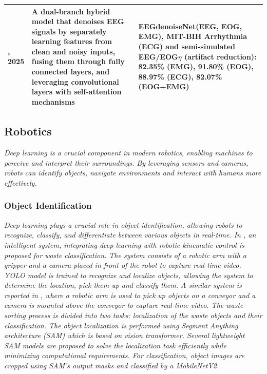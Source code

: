 \documentclass[preprint,12pt]{elsarticle}
\begin{document}
\begin{center}
\begin{table}
\begin{tabular}{|p{1cm} | p{6.5cm} | p{6.5cm}|}
 \hline
 \citep{cai_dhct-gan_2025}, 2025 & A dual-branch hybrid model that denoises EEG signals by separately learning features from clean and noisy inputs, fusing them through fully connected layers, and leveraging convolutional layers with self-attention mechanisms & EEGdenoiseNet(EEG, EOG, EMG), MIT-BIH Arrhythmia (ECG) and semi-simulated EEG/EOG\newline $\eta$ (artifact reduction): 82.35\% (EMG), 91.80\% (EOG), 88.97\% (ECG), 82.07\% (EOG+EMG)  \\ 
 \hline
\end{tabular}
\label{table_summary_eeg_studies}
\end{table}
\end{center}

\subsection{Robotics}
\emph{Deep learning is a crucial component in modern robotics, enabling machines to perceive and interpret their surroundings. By leveraging sensors and cameras, robots can identify objects, navigate environments and interact with humans more effectively.}

\subsubsection{Object Identification}
\emph{Deep learning plays a crucial role in object identification, allowing robots to recognize, classify, and differentiate between various objects in real-time. In \citep{le_application_2025}, an intelligent system, integrating deep learning with robotic kinematic control is proposed for waste classification. The system consists of a robotic arm with a gripper and a camera placed in front of the robot to capture real-time video. YOLO model is trained to recognize and localize objects, allowing the system to determine the location, pick them up and classify them. A similar system is reported in \citep{vukicevic_versatile_2025}, where a robotic arm is used to pick up objects on a conveyor and a camera is mounted above the conveyor to capture real-time video. The waste sorting process is divided into two tasks: localization of the waste objects and their classification. The object localization is performed using Segment Anything architecture (SAM) \citep{kirillov_segment_2023} which is based on vision transformer. Several lightweight SAM models are proposed to solve the localization task efficiently while minimizing computational requirements. For classification, object images are cropped using SAM's output masks and classified by a MobileNetV2.}
\end{document}
